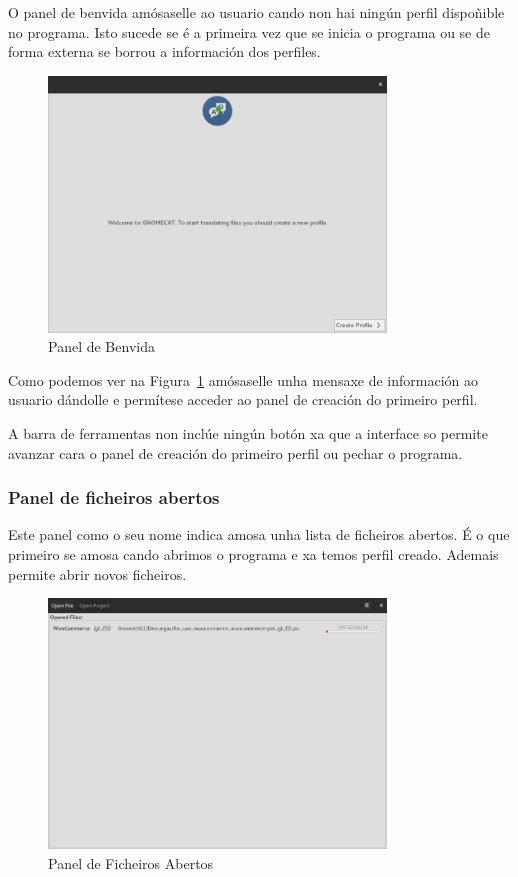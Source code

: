 O panel de benvida amósaselle ao usuario cando non hai ningún perfil dispoñible no programa. Isto sucede se é a primeira vez que se inicia o programa ou se de forma externa se borrou a información dos perfiles.

\begin{figure}[h!]
    \centering
    \includegraphics[width=0.8\textwidth]{img/panel_benvida.png}
    \caption{Panel de Benvida}
    \label{fig:ui:panel:welcome}
\end{figure}

Como podemos ver na Figura~\ref{fig:ui:panel:welcome} amósaselle unha mensaxe de información ao usuario dándolle e permítese acceder ao panel de creación do primeiro perfil.

A barra de ferramentas non inclúe ningún botón xa que a interface so permite avanzar cara o panel de creación do primeiro perfil ou pechar o programa.

\subsubsection{Panel de ficheiros abertos}

Este panel como o seu nome indica amosa unha lista de ficheiros abertos. É o que primeiro se amosa cando abrimos o programa e xa temos perfil creado. Ademais permite abrir novos ficheiros.

\begin{figure}[h!]
    \centering
    \includegraphics[width=0.8\textwidth]{img/panel_ficheiros_abertos.png}
    \caption{Panel de Ficheiros Abertos}
    \label{fig:ui:panel:openedfiles}
\end{figure}

